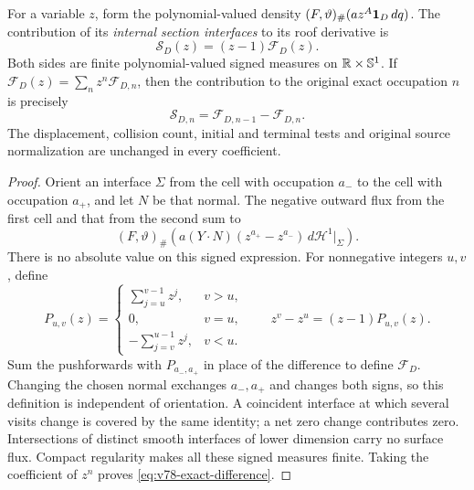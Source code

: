 \begin{theorem}
\label{thm:v78-decision-current}
For a variable $z$, form the polynomial-valued density
$(F,\vartheta)_\#(a z^A\mathbf1_D\,dq)$. The contribution of its
\emph{internal section interfaces} to its roof derivative is
\begin{equation}\label{eq:v78-section-factor}
                 \mathscr S_D(z)=(z-1)\mathscr F_D(z).
\end{equation}
Both sides are finite polynomial-valued signed measures on
$\mathbb R\times\mathbb S^1$. If
$\mathscr F_D(z)=\sum_n z^n\mathscr F_{D,n}$, then the contribution
to the original exact occupation $n$ is precisely
\begin{equation}\label{eq:v78-exact-difference}
             \mathscr S_{D,n}=\mathscr F_{D,n-1}-\mathscr F_{D,n}.
\end{equation}
The displacement, collision count, initial and terminal tests and
original source normalization are unchanged in every coefficient.
\end{theorem}
\begin{proof}
Orient an interface $\Sigma$ from the cell with occupation $a_-$
to the cell with occupation $a_+$, and let $N$ be that normal.
The negative outward flux from the first cell and that from the
second sum to
\[
 (F,\vartheta)_\#\left(
    a(Y\cdot N)(z^{a_+}-z^{a_-})\,d\mathcal H^1|_\Sigma\right).
\]
There is no absolute value on this signed expression. For nonnegative
integers $u,v$, define
\[
 P_{u,v}(z)=
 \begin{cases}
  \sum_{j=u}^{v-1}z^j,&v>u,\\
  0,&v=u,\\
  -\sum_{j=v}^{u-1}z^j,&v<u.
 \end{cases}
 \qquad z^v-z^u=(z-1)P_{u,v}(z).
\]
Sum the pushforwards with $P_{a_-,a_+}$ in place of the difference
to define $\mathscr F_D$. Changing the chosen normal exchanges
$a_-,a_+$ and changes both signs, so this definition is independent
of orientation. A coincident interface at which several visits
change is covered by the same identity; a net zero change contributes
zero. Intersections of distinct smooth interfaces of lower dimension
carry no surface flux. Compact regularity makes all these signed
measures finite. Taking the coefficient of $z^n$ proves
\eqref{eq:v78-exact-difference}.
\end{proof}

